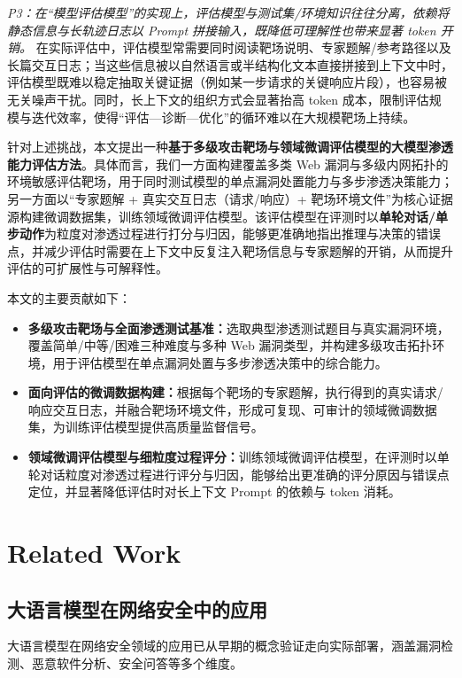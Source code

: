 \documentclass[a4paper, twocolumn]{article}
\begin{document}
\textit{P3：在“模型评估模型”的实现上，评估模型与测试集/环境知识往往分离，依赖将静态信息与长轨迹日志以 Prompt 拼接输入，既降低可理解性也带来显著 token 开销。} 在实际评估中，评估模型常需要同时阅读靶场说明、专家题解/参考路径以及长篇交互日志；当这些信息被以自然语言或半结构化文本直接拼接到上下文中时，评估模型既难以稳定抽取关键证据（例如某一步请求的关键响应片段），也容易被无关噪声干扰。同时，长上下文的组织方式会显著抬高 token 成本，限制评估规模与迭代效率，使得“评估—诊断—优化”的循环难以在大规模靶场上持续。

针对上述挑战，本文提出一种\textbf{基于多级攻击靶场与领域微调评估模型的大模型渗透能力评估方法}。具体而言，我们一方面构建覆盖多类 Web 漏洞与多级内网拓扑的环境敏感评估靶场，用于同时测试模型的单点漏洞处置能力与多步渗透决策能力；另一方面以“专家题解 + 真实交互日志（请求/响应）+ 靶场环境文件”为核心证据源构建微调数据集，训练领域微调评估模型。该评估模型在评测时以\textbf{单轮对话/单步动作}为粒度对渗透过程进行打分与归因，能够更准确地指出推理与决策的错误点，并减少评估时需要在上下文中反复注入靶场信息与专家题解的开销，从而提升评估的可扩展性与可解释性。

本文的主要贡献如下：
\begin{itemize}
    \item \textbf{多级攻击靶场与全面渗透测试基准：}选取典型渗透测试题目与真实漏洞环境，覆盖简单/中等/困难三种难度与多种 Web 漏洞类型，并构建多级攻击拓扑环境，用于评估模型在单点漏洞处置与多步渗透决策中的综合能力。
    \item \textbf{面向评估的微调数据构建：}根据每个靶场的专家题解，执行得到的真实请求/响应交互日志，并融合靶场环境文件，形成可复现、可审计的领域微调数据集，为训练评估模型提供高质量监督信号。
    \item \textbf{领域微调评估模型与细粒度过程评分：}训练领域微调评估模型，在评测时以单轮对话粒度对渗透过程进行评分与归因，能够给出更准确的评分原因与错误点定位，并显著降低评估时对长上下文 Prompt 的依赖与 token 消耗。
\end{itemize}

\section{Related Work}
\subsection{大语言模型在网络安全中的应用}
大语言模型在网络安全领域的应用已从早期的概念验证走向实际部署，涵盖漏洞检测、恶意软件分析、安全问答等多个维度。
\end{document}
